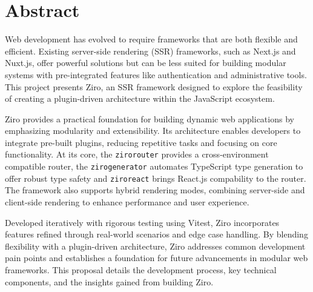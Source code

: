 \section{Abstract}

Web development has evolved to require frameworks that are both flexible and efficient. Existing server-side rendering (SSR) frameworks, such as Next.js and Nuxt.js, offer powerful solutions but can be less suited for building modular systems with pre-integrated features like authentication and administrative tools. This project presents Ziro, an SSR framework designed to explore the feasibility of creating a plugin-driven architecture within the JavaScript ecosystem.

Ziro provides a practical foundation for building dynamic web applications by emphasizing modularity and extensibility. Its architecture enables developers to integrate pre-built plugins, reducing repetitive tasks and focusing on core functionality. At its core, the \texttt{ziro\/router} provides a cross-environment compatible router, the \texttt{ziro\/generator} automates TypeScript type generation to offer robust type safety and \texttt{ziro\/react} brings React.js compability to the router. The framework also supports hybrid rendering modes, combining server-side and client-side rendering to enhance performance and user experience.

Developed iteratively with rigorous testing using Vitest, Ziro incorporates features refined through real-world scenarios and edge case handling. By blending flexibility with a plugin-driven architecture, Ziro addresses common development pain points and establishes a foundation for future advancements in modular web frameworks. This proposal details the development process, key technical components, and the insights gained from building Ziro.



\pagebreak
